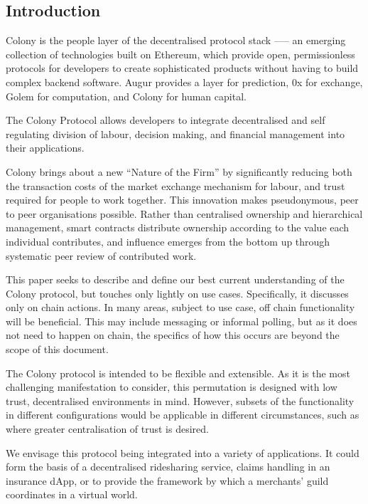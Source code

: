 \subsection*{Introduction}

Colony is the people layer of the decentralised protocol stack --— an emerging collection of technologies built on Ethereum, which provide open, permissionless protocols for developers to create sophisticated products without having to build complex backend software. Augur provides a layer for prediction, 0x for exchange, Golem for computation, and Colony for human capital.

The Colony Protocol allows developers to integrate decentralised and self regulating division of labour, decision making, and financial management into their applications. 

Colony brings about a new ``Nature of the Firm'' \cite{The-Nature-of-the-Firm} by significantly reducing both the transaction costs of the market exchange mechanism for labour, and trust required for people to work together. This innovation makes pseudonymous, peer to peer organisations possible. Rather than centralised ownership and hierarchical management, smart contracts distribute ownership according to the value each individual contributes, and influence emerges from the bottom up through systematic peer review of contributed work. 

This paper seeks to describe and define our best current understanding of the Colony protocol, but touches only lightly on use cases. Specifically, it discusses only on chain actions. In many areas, subject to use case, off chain functionality will be beneficial. This may include messaging or informal polling, but as it does not need to happen on chain, the specifics of how this occurs are beyond the scope of this document. 

The Colony protocol is intended to be flexible and extensible. As it is the most challenging manifestation to consider, this permutation is designed with low trust, decentralised environments in mind. However, subsets of the functionality in different configurations would be applicable in different circumstances, such as where greater centralisation of trust is desired.

We envisage this protocol being integrated into a variety of applications. It could form the basis of a decentralised ridesharing service, claims handling in an insurance dApp, or to provide the framework by which a merchants’ guild coordinates in a virtual world.







